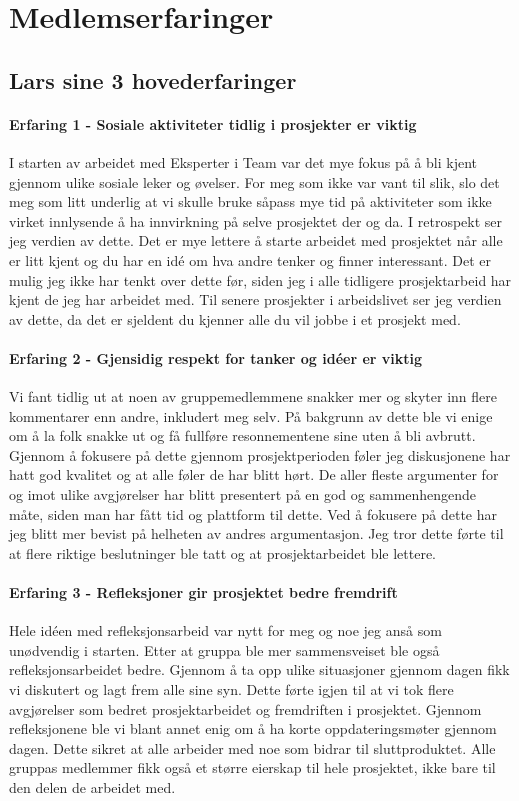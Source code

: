 \chapter{Medlemserfaringer}


\section{Lars sine 3 hovederfaringer}

\subsubsection*{Erfaring 1 - Sosiale aktiviteter tidlig i prosjekter er viktig}
I starten av arbeidet med Eksperter i Team var det mye fokus på å bli kjent gjennom ulike sosiale leker og øvelser.
For meg som ikke var vant til slik, slo det meg som litt underlig at vi skulle bruke såpass mye tid på aktiviteter som ikke virket innlysende å ha innvirkning på selve prosjektet der og da.
I retrospekt ser jeg verdien av dette. Det er mye lettere å starte arbeidet med prosjektet når alle er litt kjent og du har en idé om hva andre tenker og finner interessant.
Det er mulig jeg ikke har tenkt over dette før, siden jeg i alle tidligere prosjektarbeid har kjent de jeg har arbeidet med. Til senere prosjekter i arbeidslivet ser jeg verdien av dette, da det er sjeldent du kjenner alle du vil jobbe i et prosjekt med. 

\subsubsection*{Erfaring 2 - Gjensidig respekt for tanker og idéer er viktig}
Vi fant tidlig ut at noen av gruppemedlemmene snakker mer og skyter inn flere kommentarer enn andre, inkludert meg selv. På bakgrunn av dette ble vi enige om å la folk snakke ut og få fullføre resonnementene sine uten å bli avbrutt. Gjennom å fokusere på dette gjennom prosjektperioden føler jeg diskusjonene har hatt god kvalitet og at alle føler de har blitt hørt.
De aller fleste argumenter for og imot ulike avgjørelser har blitt presentert på en god og sammenhengende måte, siden man har fått tid og plattform til dette.
Ved å fokusere på dette har jeg blitt mer bevist på helheten av andres argumentasjon.
Jeg tror dette førte til at flere riktige beslutninger ble tatt og at prosjektarbeidet ble lettere.

\subsubsection*{Erfaring 3 - Refleksjoner gir prosjektet bedre fremdrift}
Hele idéen med refleksjonsarbeid var nytt for meg og noe jeg anså som unødvendig i starten. 
Etter at gruppa ble mer sammensveiset ble også refleksjonsarbeidet bedre. Gjennom å ta opp ulike situasjoner gjennom dagen fikk vi diskutert og lagt frem alle sine syn. 
Dette førte igjen til at vi tok flere avgjørelser som bedret prosjektarbeidet og fremdriften i prosjektet.
Gjennom refleksjonene ble vi blant annet enig om å ha korte oppdateringsmøter gjennom dagen. Dette sikret at alle arbeider med noe som bidrar til sluttproduktet. Alle gruppas medlemmer fikk også et større eierskap til hele prosjektet, ikke bare til den delen de arbeidet med.

